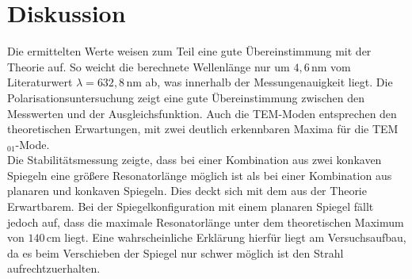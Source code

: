 \section{Diskussion}
Die ermittelten Werte weisen zum Teil eine gute Übereinstimmung mit der Theorie auf. So weicht die berechnete Wellenlänge nur um $4,6\,\si{\nano\meter}$ vom Literaturwert
$\lambda=632,8\,\si{\nano\meter}$ \cite{anleitung} ab, was innerhalb der Messungenauigkeit liegt. Die Polarisationsuntersuchung zeigt eine gute Übereinstimmung zwischen
den Messwerten und der Ausgleichsfunktion. Auch die TEM-Moden entsprechen den theoretischen Erwartungen, mit zwei deutlich erkennbaren Maxima für die TEM$_{01}$-Mode.\\
Die Stabilitätsmessung zeigte, dass bei einer Kombination aus zwei konkaven Spiegeln eine größere Resonatorlänge möglich ist als bei einer Kombination aus planaren und konkaven Spiegeln.
Dies deckt sich mit dem aus der Theorie Erwartbarem. Bei der Spiegelkonfiguration mit einem planaren Spiegel fällt jedoch auf, dass die maximale Resonatorlänge unter dem theoretischen Maximum von $140 \, \si{\centi\meter}$ liegt. Eine
wahrscheinliche Erklärung hierfür liegt am Versuchsaufbau, da es beim Verschieben der Spiegel nur schwer möglich ist den Strahl aufrechtzuerhalten.
